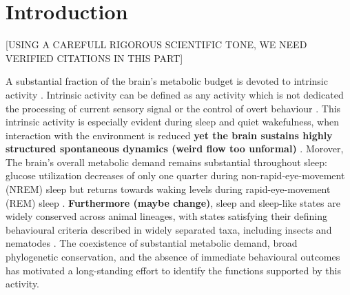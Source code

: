 \documentclass[10pt,letterpaper]{article}
\theoremstyle{plain}
\theoremstyle{remark}
\begin{document}
\section{Introduction}

[USING A CAREFULL RIGOROUS SCIENTIFIC TONE, WE NEED VERIFIED CITATIONS IN THIS PART]

A substantial fraction of the brain's metabolic budget is devoted to intrinsic activity \cite{raichle2002budget,raichle2006dark}. Intrinsic activity can be defined as any activity which is not dedicated the processing of current sensory signal or the control of overt behaviour \cite{raichle2002budget,raichle2006dark}. This intrinsic activity is especially evident during sleep and quiet wakefulness, when interaction with the environment is reduced \textbf{yet the brain sustains highly structured spontaneous dynamics (weird flow too unformal)} \cite{steriade1993thalamocortical,diekelmann2010memory}. Morover, The brain’s overall metabolic demand remains substantial throughout sleep: glucose utilization decreases of only one quarter during non-rapid-eye-movement (NREM) sleep but returns towards waking levels during rapid-eye-movement (REM) sleep \cite{buchsbaum1989sleep,maquet1990cerebral}. \textbf{Furthermore (maybe change)}, sleep and sleep-like states are widely conserved across animal lineages, with states satisfying their defining behavioural criteria described in widely separated taxa, including insects and nematodes \cite{cirelli2008essential}. The coexistence of substantial metabolic demand, broad phylogenetic conservation, and the absence of immediate behavioural outcomes has motivated a long-standing effort to identify the functions supported by this activity. 

\end{document}
